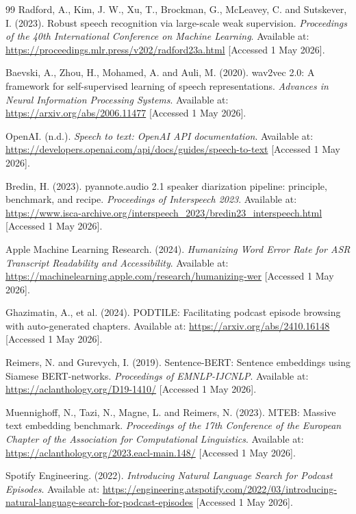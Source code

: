 \documentclass[11pt,a4paper]{article}
\begin{document}
\begin{thebibliography}{99}
Radford, A., Kim, J. W., Xu, T., Brockman, G., McLeavey, C. and Sutskever, I. (2023).
Robust speech recognition via large-scale weak supervision.
\textit{Proceedings of the 40th International Conference on Machine Learning}.
Available at: \url{https://proceedings.mlr.press/v202/radford23a.html}
[Accessed 1 May 2026].

Baevski, A., Zhou, H., Mohamed, A. and Auli, M. (2020).
wav2vec 2.0: A framework for self-supervised learning of speech representations.
\textit{Advances in Neural Information Processing Systems}.
Available at: \url{https://arxiv.org/abs/2006.11477}
[Accessed 1 May 2026].

OpenAI. (n.d.).
\textit{Speech to text: OpenAI API documentation}.
Available at: \url{https://developers.openai.com/api/docs/guides/speech-to-text}
[Accessed 1 May 2026].

Bredin, H. (2023).
pyannote.audio 2.1 speaker diarization pipeline: principle, benchmark, and recipe.
\textit{Proceedings of Interspeech 2023}.
Available at: \url{https://www.isca-archive.org/interspeech_2023/bredin23_interspeech.html}
[Accessed 1 May 2026].

Apple Machine Learning Research. (2024).
\textit{Humanizing Word Error Rate for ASR Transcript Readability and Accessibility}.
Available at: \url{https://machinelearning.apple.com/research/humanizing-wer}
[Accessed 1 May 2026].

Ghazimatin, A., et al. (2024).
PODTILE: Facilitating podcast episode browsing with auto-generated chapters.
Available at: \url{https://arxiv.org/abs/2410.16148}
[Accessed 1 May 2026].

Reimers, N. and Gurevych, I. (2019).
Sentence-BERT: Sentence embeddings using Siamese BERT-networks.
\textit{Proceedings of EMNLP-IJCNLP}.
Available at: \url{https://aclanthology.org/D19-1410/}
[Accessed 1 May 2026].

Muennighoff, N., Tazi, N., Magne, L. and Reimers, N. (2023).
MTEB: Massive text embedding benchmark.
\textit{Proceedings of the 17th Conference of the European Chapter of the Association for Computational Linguistics}.
Available at: \url{https://aclanthology.org/2023.eacl-main.148/}
[Accessed 1 May 2026].

Spotify Engineering. (2022).
\textit{Introducing Natural Language Search for Podcast Episodes}.
Available at: \url{https://engineering.atspotify.com/2022/03/introducing-natural-language-search-for-podcast-episodes}
[Accessed 1 May 2026].


\end{thebibliography}
\end{document}

